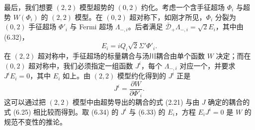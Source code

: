 
最后，我们想要 $(2,2)$ 模型超势的 $(0,2)$ 约化。考虑一个含手征超场 $\Phi_i$ 与超势 $W(\Phi_i)$ 的 $(2,2)$ 模型。在 $(0,2)$ 超对称下，如刚才所见，$\Phi_i$ 分裂为 $(0,2)$ 手征超场 $\Phi'_i$ 与 Fermi 超场 $\Lambda_{-,i}$。后者满足 $\bar{\mathcal{D}}_+\Lambda_{-,i}=\sqrt2E_i$，其中由 (6.32)，
\begin{equation}
E_i=iQ_i\sqrt2\Sigma'\Phi'_i.\tag{6.33}
\end{equation}
在 $(2,2)$ 超对称中，手征超场的标量耦合与汤川耦合由单个函数 $W$ 决定；而在 $(0,2)$ 超对称中，我们必须指定一组函数 $J^i$，每个 $\Lambda_{-,i}$ 对应一个，并要求 $J^iE_i=0$，其中 $E_i$ 如上。由 $(2,2)$ 模型约化得到的 $J^i$ 正是
\begin{equation}
J^i=\frac{\partial W}{\partial\Phi'_i}.\tag{6.34}
\end{equation}
这可以通过把 $(2,2)$ 模型中由超势导出的耦合的式 (2.21) 与由 $J$ 确定的耦合的式 (6.25) 相比较而得到。取 (6.34) 的 $J^i$ 与 (6.33) 的 $E_i$，方程 $E_iJ^i=0$ 是 $W$ 的规范不变性的推论。

